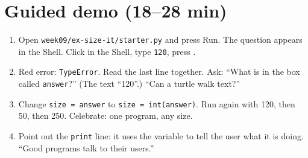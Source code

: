 \section{Guided demo (18--28 min)}
\begin{workedexample}
\begin{enumerate}[leftmargin=1.4em,itemsep=1pt]
  \item Open \texttt{week09/ex-size-it/starter.py} and press Run. The question appears in the Shell. Click in the Shell, type \texttt{120}, press .
  \item Red error: \texttt{TypeError}. Read the last line together. Ask: \enquote{What is in the box called \texttt{answer}?} (The text \enquote{120}.) \enquote{Can a turtle walk text?}
  \item Change \texttt{size = answer} to \texttt{size = int(answer)}. Run again with 120, then 50, then 250. Celebrate: one program, any size.
  \item Point out the \texttt{print} line: it uses the variable to tell the user what it is doing. \enquote{Good programs talk to their users.}
\end{enumerate}
\end{workedexample}

